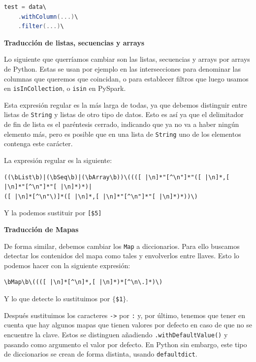 \documentclass[12pt,twoside,titlepage]{report}
\begin{document}
\begin{lstlisting}[language=scala]
test = data\
	.withColumn(...)\
	.filter(...)\
\end{lstlisting}


\textbf{Traducción de listas, secuencias y arrays}

Lo siguiente que querríamos cambiar son las listas, secuencias y arrays por arrays de Python. Estas se usan por ejemplo en las intersecciones para denominar las columnas que queremos que coincidan, o para establecer filtros que luego usamos en \texttt{isInCollection}, o \texttt{isin} en PySpark. 

Esta expresión regular es la más larga de todas, ya que debemos distinguir entre listas de \texttt{String} y listas de otro tipo de datos. Esto es así ya que el delimitador de fin de lista es el paréntesis cerrado, indicando que ya no va a haber ningún elemento más, pero es posible que en una lista de \texttt{String} uno de los elementos contenga este carácter.

La expresión regular es la siguiente:

\begin{Verbatim}[fontsize=\scriptsize,frame=single]
((\bList\b)|(\bSeq\b)|(\bArray\b))\((([ |\n]*"[^\n"]*"([ |\n]*,[ |\n]*"[^\n"]*"[ |\n]*)*)|
([ |\n]*[^\n"\)]*([ |\n]*,[ |\n]*"[^\n"]*"[ |\n]*)*))\)
\end{Verbatim}

Y la podemos sustituir por \texttt{[\$5]}


\textbf{Traducción de Mapas}

De forma similar, debemos cambiar los \texttt{Map} a diccionarios. Para ello buscamos detectar los contenidos del mapa como tales y envolverlos entre llaves. Esto lo podemos hacer con la siguiente expresión:

\begin{lstlisting}
\bMap\b\((([ |\n]*[^\n]*,[ |\n]*)*[^\n\.]*)\)
\end{lstlisting}

Y lo que detecte lo sustituimos por \texttt{$\lbrace$\$1$\rbrace$}.

Después sustituimos los caracteres \texttt{->} por \texttt{:} y, por último, tenemos que tener en cuenta que hay algunos mapas que tienen valores por defecto en caso de que no se encuentre la clave. Estos se distinguen añadiendo \texttt{.withDefaultValue()} y pasando como argumento el valor por defecto. En Python sin embargo, este tipo de diccionarios se crean de forma distinta, usando \texttt{defaultdict}.
\end{document}
